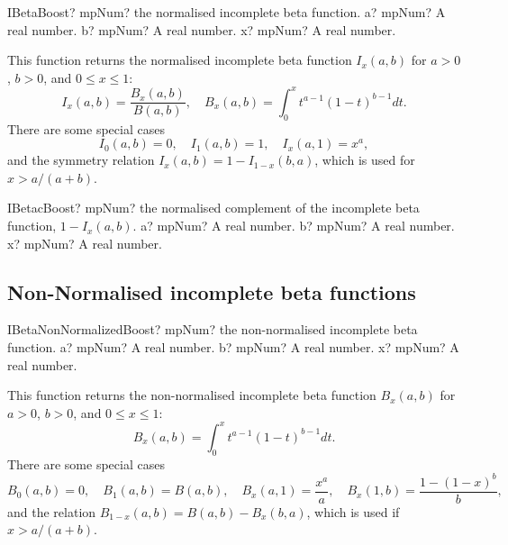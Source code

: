 \begin{mpFunctionsExtract}
	\mpFunctionThree
	{IBetaBoost? mpNum? the normalised incomplete beta function.}
	{a? mpNum? A real number.}
	{b? mpNum? A real number.}
	{x? mpNum? A real number.}
\end{mpFunctionsExtract}

\vspace{0.3cm}
This function returns the normalised incomplete beta function $I_x(a,b)$ for $a>0$, $b>0$, and $0 \leq x \leq 1$:
\begin{equation}
	I_x(a,b) = \frac{B_x(a,b)}{B(a,b)}, \quad B_x(a,b) = \int_0^x t^{a-1} (1-t)^{b-1} dt.
\end{equation}
There are some special cases
\begin{equation}
	I_0(a,b)=0, \quad I_1(a,b)=1, \quad I_x(a,1)=x^a,
\end{equation}
and the symmetry relation $I_x(a,b)=1-I_{1-x}(b,a)$, which is used for $x>a/(a+b)$.


\vspace{0.6cm}
\begin{mpFunctionsExtract}
	\mpFunctionThree
	{IBetacBoost? mpNum? the normalised complement of the incomplete beta function, $1 - I_x(a,b)$.}
	{a? mpNum? A real number.}
	{b? mpNum? A real number.}
	{x? mpNum? A real number.}
\end{mpFunctionsExtract}




\subsection{Non-Normalised incomplete beta functions}

\begin{mpFunctionsExtract}
	\mpFunctionThree
	{IBetaNonNormalizedBoost? mpNum? the non-normalised incomplete beta function.}
	{a? mpNum? A real number.}
	{b? mpNum? A real number.}
	{x? mpNum? A real number.}
\end{mpFunctionsExtract}

\vspace{0.3cm}
This function returns the non-normalised incomplete beta function $B_x(a,b)$ for $a>0$, $b>0$, and $0 \leq x \leq 1$:
\begin{equation}
	B_x(a,b) = \int_0^x t^{a-1} (1-t)^{b-1} dt.
\end{equation}
There are some special cases
\begin{equation}
	B_0(a,b)=0, \quad B_1(a,b)=B(a,b), \quad B_x(a,1)= \frac{x^a}{a}, \quad B_x(1,b)= \frac{1-(1-x)^b}{b},
\end{equation}
and the relation $B_{1-x}(a,b)=B(a,b)-B_x(b,a)$, which is used if $x>a/(a+b)$. 


